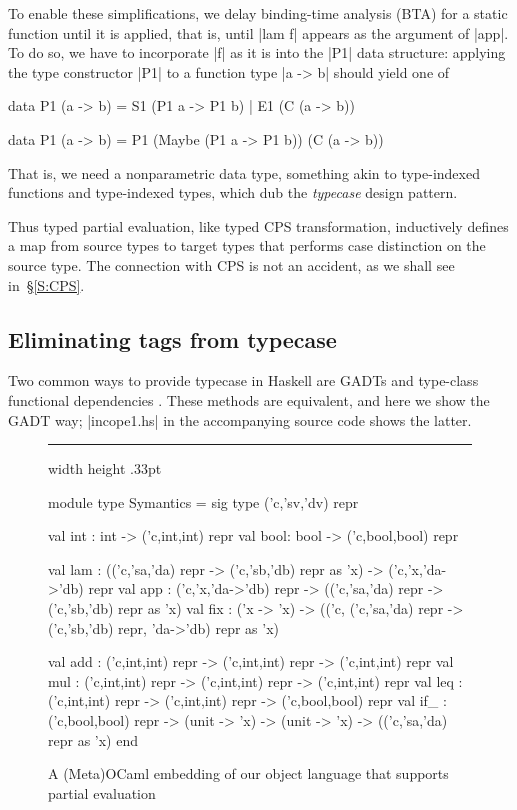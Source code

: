 \documentclass[preprint]{sigplanconf}
\newenvironment{floatrule}
    {\hrule width \hsize height .33pt \vspace{.5pc}}
    {\par\addvspace{1ex}}
\begin{document}
To enable these simplifications, we delay binding-time analysis (BTA)
for a static function until it is applied, that is, until |lam f|
appears as the argument of |app|.  To do so, we have to incorporate |f|
as it is into the |P1| data structure: applying the type constructor
|P1| to a function type |a -> b| should yield one of
\begin{code}
data P1 (a -> b) = S1 (P1 a -> P1 b)
                 | E1 (C (a -> b))

data P1 (a -> b) = P1 (Maybe (P1 a -> P1 b))
                      (C (a -> b))
\end{code}
That is, we need a nonparametric data type, something akin to
type-indexed functions and type-indexed types, which
\citet{oliveira-typecase} dub the \emph{typecase} design pattern.

Thus typed partial evaluation, like typed CPS transformation,
inductively defines a map from source types to target types that
performs case distinction on the source type.  The connection with CPS
is not an accident, as we shall see in~\S\ref{S:CPS}.

\subsection{Eliminating tags from typecase}
\label{S:PE-GADT}

Two common ways to provide typecase in Haskell are
GADTs and type-class functional dependencies
\citep{oliveira-typecase}.  These
methods are equivalent, and here we show the GADT way; |incope1.hs|
in the accompanying source code shows the latter.

\begin{figure*}
\begin{floatrule}
\begin{code}
module type Symantics = sig
  type ('c,'sv,'dv) repr

  val int : int  -> ('c,int,int) repr
  val bool: bool -> ('c,bool,bool) repr

  val lam : (('c,'sa,'da) repr -> ('c,'sb,'db) repr as 'x) -> ('c,'x,'da->'db) repr
  val app : ('c,'x,'da->'db) repr -> (('c,'sa,'da) repr -> ('c,'sb,'db) repr as 'x)
  val fix : ('x -> 'x) -> (('c, ('c,'sa,'da) repr -> ('c,'sb,'db) repr, 'da->'db) repr as 'x)

  val add : ('c,int,int) repr -> ('c,int,int) repr -> ('c,int,int) repr
  val mul : ('c,int,int) repr -> ('c,int,int) repr -> ('c,int,int) repr
  val leq : ('c,int,int) repr -> ('c,int,int) repr -> ('c,bool,bool) repr
  val if_ : ('c,bool,bool) repr -> (unit -> 'x) -> (unit -> 'x) -> (('c,'sa,'da) repr as 'x)
end
\end{code}
\end{floatrule}
\caption{A (Meta)OCaml embedding of our object language that supports partial evaluation}
\label{fig:ocaml}
\end{figure*}
\end{document}
